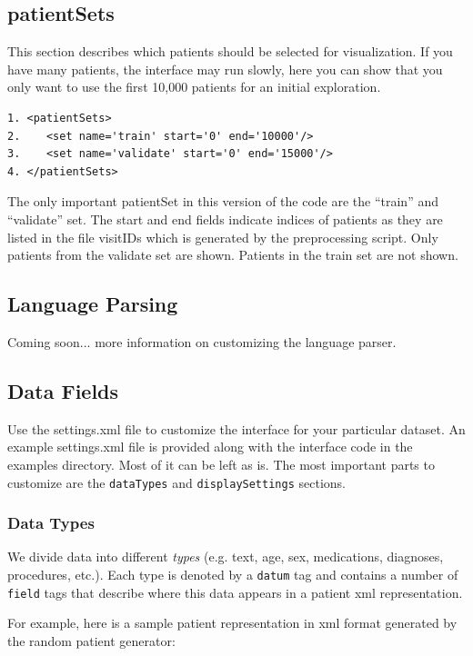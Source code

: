 \documentclass[12pt]{article}
\begin{document}
\subsection{patientSets}
This section describes which patients should be selected for visualization. If you have many patients, the interface may run slowly, here you can show that you only want to use the first 10,000 patients for an initial exploration.

\begin{verbatim}
1. <patientSets>
2.    <set name='train' start='0' end='10000'/>
3.    <set name='validate' start='0' end='15000'/>
4. </patientSets>
\end{verbatim}

The only important patientSet in this version of the code are the ``train'' and ``validate'' set. 
The start and end fields indicate indices of patients as they are listed in the file visitIDs which is generated by the preprocessing script.
Only patients from the validate set are shown. Patients in the train set are not shown.

\subsection{Language Parsing}
\label{sec:custom_language_processing}
Coming soon... more information on customizing the language parser.


\subsection{Data Fields}
\label{sec:custom_settings}
Use the settings.xml file to customize the interface for your particular dataset. An example settings.xml file is provided along with the interface code in the examples directory. Most of it can be left as is. The most important parts to customize are the {\tt dataTypes} and {\tt displaySettings} sections.


\subsubsection{Data Types}
\label{sec:dataTypes}
We divide data into different {\em types} (e.g. text, age, sex, medications, diagnoses, procedures, etc.). Each type is denoted by a {\tt datum} tag and contains a number of {\tt field} tags that describe where this data appears in a patient xml representation.

For example, here is a sample patient representation in xml format generated by the random patient generator:
\end{document}
